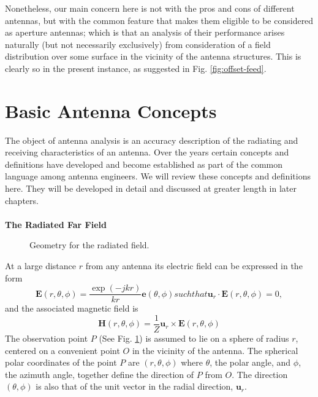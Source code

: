 Nonetheless, our main concern here is not with the pros and cons of different antennas, but with the common feature that makes them eligible to be considered as aperture antennas; which is that an analysis of their performance arises naturally (but not necessarily exclusively) from consideration of a field distribution over some surface in the vicinity of the antenna structures. This is clearly so in the present instance, as suggested in Fig. \ref{fig:offset-feed}.


\section{Basic Antenna Concepts}
\label{sec:antconc}
The object of antenna analysis is an accuracy description of the radiating and receiving characteristics of an antenna. Over the years certain concepts and definitions have developed and become established as part of the common language among antenna engineers. We will review these concepts and definitions here. They will be developed in detail and discussed at greater length in later chapters.\\
\\
\textbf{The Radiated Far Field}\\
\begin{figure}[htbp]
	\begin{center}
	\end{center}
	\caption{Geometry for the radiated field.}
	\label{fig:geo3d}
\end{figure}
At a large distance $r$ from any antenna its electric field can be expressed in the form
\begin{subequations}
	\label{eq:radff}
	\begin{equation}
	\mathbf{E}(r,\theta,\phi)=\frac{\exp(-jkr)}{kr}\mathbf{e}(\theta,\phi)
	\label{eq:antffexpr}
	\end{equation}
	such that
	\begin{equation}
	\mathbf{u}_r\cdot\mathbf{E}(r,\theta,\phi)=0,
	\label{eq:tanfd}
	\end{equation}
\end{subequations}
and the associated magnetic field is
\begin{equation}
\mathbf{H}(r,\theta,\phi)=\frac{1}{Z}\mathbf{u}_r\times\mathbf{E}(r,\theta,\phi)
\label{eq:magfd}
\end{equation}
The observation point $P$ (See Fig. \ref{fig:geo3d}) is assumed to lie on a sphere of radius $r$, centered on a convenient point $O$ in the vicinity of the antenna.
The spherical polar coordinates of the point $P$ are $(r,\theta,\phi)$ where $\theta$, the polar angle, and $\phi$, the azimuth angle, together define the direction of $P$ from $O$. The direction $(\theta, \phi)$ is also that of the unit vector in the radial direction, $\mathbf{u}_r$.


